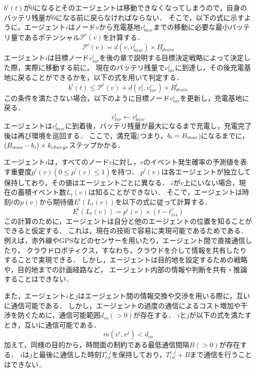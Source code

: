 \documentclass[12pt,a4j,twoside]{jarticle}
\def\BatteryMax{{B_{\it max}}}
\def\BatteryLevel{b}
\begin{document}
$b^i(t)$が0になるとそのエージェントは移動できなくなってしまうので，自身のバッテリ残量が0になる前に戻らなければならない．
そこで，以下の式に示すように，エージェント$i$はノード$v$から充電基地$v^i_{base}$までの移動に必要な最小バッテリ量であるポテンシャル$\mathcal{P}^i(v)$を計算する．
%
\begin{equation}
  \mathcal{P}^i(v) = d(v, v^i_{base}) \times B^i_{drain}
\end{equation}
%
エージェント$i$は目標ノード$v^i_{tar}$を後の章で説明する目標決定戦略によって決定した際，実際に移動する前に，
現在のバッテリ残量で$v^i_{tar}$に到達し，その後充電基地に戻ることができるかを，以下の式を用いて判定する．
%
\begin{equation}
  b^i(t) \leq \mathcal{P}^i(v) + d(v^i_t, v^i_{tar}) \times B^i_{drain}
\end{equation}
%
この条件を満たさない場合，以下のように目標ノード$v^i_{tar}$を更新し，充電基地に戻る．
%
\begin{equation}
  v^i_{tar} \gets v^i_{base}
\end{equation}
%
エージェントは$v^i_{base}$に到着後，バッテリ残量が最大になるまで充電し，充電完了後は再び環境を巡回する．
ここで，満充電(つまり，$\BatteryLevel_i=\BatteryMax$)になるまでに，
$(\BatteryMax-\BatteryLevel_i)\times k_{charge}$ステップかかる．
\par

エージェント$i$は，すべてのノード$v$に対し，$v$のイベント発生確率の予測値を表す重要度$p^i(v) (0 \leq p^i(v) \leq 1)$を持つ．
$p^i(v)$は各エージェントが独立して保持しており，その値はエージェントごとに異なる．
$i$が$v$上にいない場合，現在の蓄積イベント数$L_t(v)$は知ることができない．
そこで，エージェントは時刻$t$の$p(v)$から期待値$E^i(L_t(v))$を以下の式に従って計算する．
%
\begin{equation}\label{eq:EL}
  E^i(L_t(v)) = p^i(v) \times (t - t^v_{vis})
\end{equation}
%
この計算のために，エージェントは自分と他のエージェントの位置を知ることができると仮定する．
これは，現在の技術で容易に実現可能であるためである．
例えば，赤外線やGPSなどのセンサーを用いたり，エージェント間で直接通信したり，
クラウドロボティクス，すなわち，クラウドを介して情報を共有したりすることで実現できる．
しかし，エージェントは目的地を設定するための戦略や，目的地までの計画経路など，
エージェント内部の情報や判断を共有・推論することはできない．
\par

また，エージェント$i$と$j$はエージェント間の情報交換や交渉を用いる際に，互いに通信可能である．
しかし，エージェントの過度の通信によるコスト増加や干渉を防ぐために，通信可能範囲$d_{co}(>0)$が存在する．
$i$と$j$が以下の式を満たすとき，互いに通信可能である．
%
\begin{equation}
  m(v^i, v^j) < d_{co}
\end{equation}
%
加えて，同様の目的から，時間面の制約である最低通信間隔$B(>0)$が存在する．
$i$は$j$と最後に通信した時刻$T^{i, j}_{lst}$を保持しており，$T^{i, j}_{lst} + B$まで通信を行うことはできない．
\par
\end{document}
